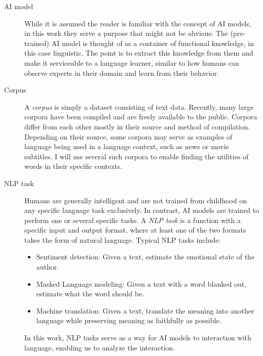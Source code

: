 \begin{description}
	\item [AI model]
 While it is assumed the reader is familiar with the concept of AI models, in this work they serve a purpose that might not be obvious:
 The (pre-trained) AI model is thought of as a container of functional knowledge, in this case linguistic.
 The point is to extract this knowledge from them and make it serviceable to a language learner, similar to how humans can observe experts in their domain and learn from their behavior.

	\item [Corpus]
	      A \textit{corpus} is simply a dataset consisting of text data.
	      Recently, many large corpora have been compiled and are freely available to the public.
	      Corpora differ from each other mostly in their source and method of compilation.
	      Depending on their source, some corpora may serve as examples of language being used in a language context, such as news or movie subtitles.
	      I will use several such corpora to enable finding the utilities of words in their specific contexts.
	\item [NLP task]
	      Humans are generally intelligent and are not trained from childhood on any specific language task exclusively.
	      In contrast, AI models are trained to perform one or several specific tasks.
	      A \textit{NLP task} is a function with a specific input and output format, where at least one of the two formats takes the form of natural language.
	      Typical NLP tasks include:

	      \begin{itemize}
		      \item Sentiment detection: Given a text, estimate the emotional state of the author.
		      \item Masked Language modeling: Given a text with a word blanked out, estimate what the word should be.
		      \item Machine translation: Given a text, translate the meaning into another language while preserving meaning as faithfully as possible.
	      \end{itemize}

	      In this work, NLP tasks serve as a way for AI models to interaction with language, enabling us to analyze the interaction.


\end{description}
